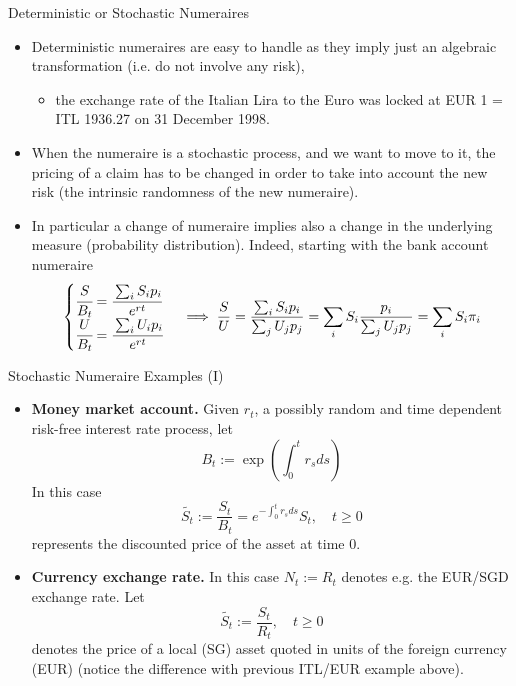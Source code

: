 \documentclass{beamer}
\begin{document}
\begin{frame}{Deterministic or Stochastic Numeraires}
	\begin{itemize}
		\item<1-> \textcolor{maincolor}{Deterministic numeraires} are easy to handle as they imply just an algebraic transformation (i.e. do not involve any risk),
		\begin{itemize}
			\item the exchange rate of the Italian Lira to the Euro was locked at EUR 1 = ITL 1936.27 on 31 December 1998.
		\end{itemize}
		\item<2-> When the numeraire is a \textcolor{maincolor}{stochastic process}, and we want to move to it, the pricing of a claim has to be changed in order to take into account the new risk (the intrinsic randomness of the new numeraire).
		\item<3-> In particular a change of numeraire implies also a change in the underlying measure (probability distribution). Indeed, starting with the bank account numeraire
		\begin{equation*}
			\begin{cases}
				\cfrac{S}{B_t} = \cfrac{\sum_i S_i p_i}{e^{rt}}\\
				\cfrac{U}{B_t} = \cfrac{\sum_i U_i p_i}{e^{rt}}
			\end{cases}\implies
			\frac{S}{U} = \frac{\sum_i S_i p_i}{\sum_j U_j p_j} = \sum_i S_i \frac{p_i}{\sum_j U_j p_j} = \sum_i S_i \pi_i
		\end{equation*}
	\end{itemize}
\end{frame}

\begin{frame}{Stochastic Numeraire Examples (I)}
	\begin{itemize}
		\item<1-> \textbf{Money market account.} Given $r_t$, a possibly random and time dependent risk-free interest rate process, let
		\begin{equation*}
			B_t := \exp\left(\int_0^t r_s ds\right)
		\end{equation*}
		In this case
		\begin{equation*}
			\tilde{S_t}:=\frac{S_t}{B_t}=e^{-\int_0^t r_s ds}S_t, \quad t \ge 0
		\end{equation*}
		represents the discounted price of the asset at time 0.
		\item<2-> \textbf{Currency exchange rate.} In this case $N_t := R_t$ denotes e.g. the EUR/SGD exchange rate. Let
		\begin{equation*}
			\tilde{S_t}:=\frac{S_t}{R_t}, \quad t \ge 0
		\end{equation*}
		denotes the price of a local (SG) asset quoted in units of the foreign currency (EUR) (notice the difference with previous ITL/EUR example above).
	\end{itemize}
\end{frame}
\end{document}

